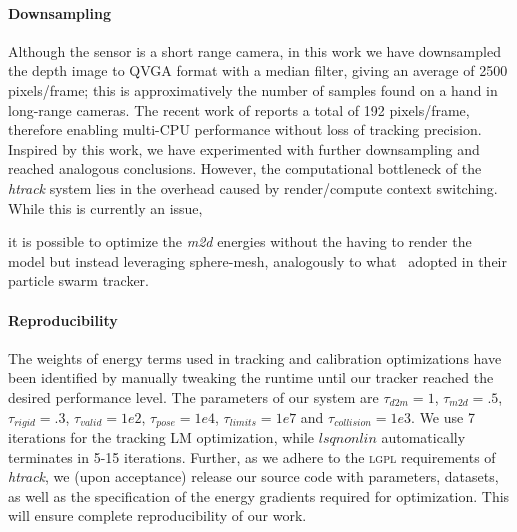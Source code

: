 \paragraph{Downsampling}
Although the \realsense{} sensor is a short range camera, in this work we have downsampled the depth image to QVGA format with a median filter, giving an average of 2500 pixels/frame; this is approximatively the number of samples found on a hand in long-range cameras. The recent work of \cite{taylor2016concerto} reports a total of 192 pixels/frame, therefore enabling multi-CPU performance without loss of tracking precision. Inspired by this work, we have experimented with further downsampling and reached analogous conclusions. However, the computational bottleneck of the \emph{htrack} system lies in the overhead caused by render/compute context switching. While this is currently an issue, 
\begin{draft}
it is possible to optimize the \emph{m2d} energies without the having to render the model but instead leveraging sphere-mesh, analogously to what~\cite{qian2014realtime} adopted in their particle swarm tracker.
\end{draft}

\paragraph{Reproducibility}
% 
The weights of energy terms used in tracking and calibration optimizations have been identified by manually tweaking the runtime until our tracker reached the desired performance level. 
The parameters of our system are $\tau_{d2m}=1$, $\tau_{m2d}=.5$, $\tau_{rigid}=.3$, $\tau_{valid}=1e2$, $\tau_{pose}=1e4$, $\tau_{limits}=1e7$ and $\tau_{collision}=1e3$. We use 7 iterations for the tracking LM optimization, while $lsqnonlin$ automatically terminates in 5-15 iterations. Further, as we adhere to the \textsc{lgpl} requirements of \emph{htrack}, we (upon acceptance) release our source code with parameters, datasets, as well as the specification of the energy gradients required for optimization. This will ensure complete reproducibility of our work.